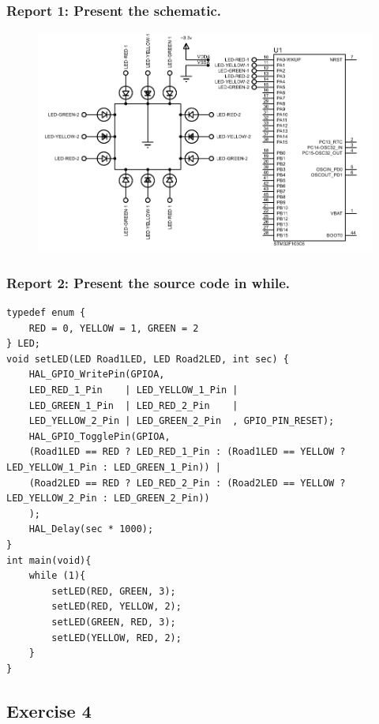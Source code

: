 \documentclass[a4paper,12pt]{article}
\begin{document}
\subsubsection{Report 1: Present the schematic.}
\label{ex3r1}
\begin{figure}[H]
	\centering
	\includegraphics[width=0.95\linewidth]{Attachments/1.3.1.PDF}
\end{figure}
\subsubsection{Report 2: Present the source code in while.}
\begin{lstlisting}
typedef enum {
	RED = 0, YELLOW = 1, GREEN = 2
} LED;
void setLED(LED Road1LED, LED Road2LED, int sec) {
	HAL_GPIO_WritePin(GPIOA,
	LED_RED_1_Pin    | LED_YELLOW_1_Pin |
	LED_GREEN_1_Pin  | LED_RED_2_Pin    |
	LED_YELLOW_2_Pin | LED_GREEN_2_Pin  , GPIO_PIN_RESET);
	HAL_GPIO_TogglePin(GPIOA,
	(Road1LED == RED ? LED_RED_1_Pin : (Road1LED == YELLOW ? LED_YELLOW_1_Pin : LED_GREEN_1_Pin)) |
	(Road2LED == RED ? LED_RED_2_Pin : (Road2LED == YELLOW ? LED_YELLOW_2_Pin : LED_GREEN_2_Pin))
	);
	HAL_Delay(sec * 1000);
}
int main(void){
	while (1){
		setLED(RED, GREEN, 3);
		setLED(RED, YELLOW, 2);
		setLED(GREEN, RED, 3);
		setLED(YELLOW, RED, 2);
	}
}
\end{lstlisting}
\newpage
\subsection{Exercise 4}
\end{document}
